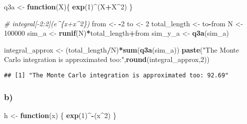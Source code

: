 \documentclass[
]{article}
\newenvironment{Shaded}{\begin{snugshade}}{\end{snugshade}}
\newcommand{\CommentTok}[1]{\textcolor[rgb]{0.56,0.35,0.01}{\textit{#1}}}
\newcommand{\ControlFlowTok}[1]{\textcolor[rgb]{0.13,0.29,0.53}{\textbf{#1}}}
\newcommand{\DecValTok}[1]{\textcolor[rgb]{0.00,0.00,0.81}{#1}}
\newcommand{\FunctionTok}[1]{\textcolor[rgb]{0.13,0.29,0.53}{\textbf{#1}}}
\newcommand{\NormalTok}[1]{#1}
\newcommand{\OtherTok}[1]{\textcolor[rgb]{0.56,0.35,0.01}{#1}}
\newcommand{\SpecialCharTok}[1]{\textcolor[rgb]{0.81,0.36,0.00}{\textbf{#1}}}
\newcommand{\StringTok}[1]{\textcolor[rgb]{0.31,0.60,0.02}{#1}}
\begin{document}
\begin{Shaded}
\begin{Highlighting}[]
\NormalTok{q3a }\OtherTok{\textless{}{-}} \ControlFlowTok{function}\NormalTok{(X)\{}
  \FunctionTok{exp}\NormalTok{(}\DecValTok{1}\NormalTok{)}\SpecialCharTok{\^{}}\NormalTok{(X}\SpecialCharTok{+}\NormalTok{X}\SpecialCharTok{\^{}}\DecValTok{2}\NormalTok{)}
\NormalTok{\}}
\end{Highlighting}
\end{Shaded}

\begin{Shaded}
\begin{Highlighting}[]
\CommentTok{\# integral[{-}2:2](e\^{}\{x+x\^{}2\})}
\NormalTok{from }\OtherTok{\textless{}{-}} \SpecialCharTok{{-}}\DecValTok{2}
\NormalTok{to }\OtherTok{\textless{}{-}} \DecValTok{2}
\NormalTok{total\_length }\OtherTok{\textless{}{-}}\NormalTok{ to}\SpecialCharTok{{-}}\NormalTok{from}
\NormalTok{N }\OtherTok{\textless{}{-}}  \DecValTok{100000}
\NormalTok{sim\_a }\OtherTok{\textless{}{-}} \FunctionTok{runif}\NormalTok{(N)}\SpecialCharTok{*}\NormalTok{total\_length}\SpecialCharTok{+}\NormalTok{from}
\NormalTok{sim\_y\_a }\OtherTok{\textless{}{-}} \FunctionTok{q3a}\NormalTok{(sim\_a)}

\NormalTok{integral\_approx }\OtherTok{\textless{}{-}}\NormalTok{ (total\_length}\SpecialCharTok{/}\NormalTok{N)}\SpecialCharTok{*}\FunctionTok{sum}\NormalTok{(}\FunctionTok{q3a}\NormalTok{(sim\_a))}
\FunctionTok{paste}\NormalTok{(}\StringTok{"The Monte Carlo integration is approximated too:"}\NormalTok{,}\FunctionTok{round}\NormalTok{(integral\_approx,}\DecValTok{2}\NormalTok{))}
\end{Highlighting}
\end{Shaded}

\begin{verbatim}
## [1] "The Monte Carlo integration is approximated too: 92.69"
\end{verbatim}

\hypertarget{b-1}{%
\subsubsection{b)}\label{b-1}}

\begin{Shaded}
\begin{Highlighting}[]
\NormalTok{h }\OtherTok{\textless{}{-}} \ControlFlowTok{function}\NormalTok{(x) \{}
    \FunctionTok{exp}\NormalTok{(}\DecValTok{1}\NormalTok{)}\SpecialCharTok{\^{}{-}}\NormalTok{(x}\SpecialCharTok{\^{}}\DecValTok{2}\NormalTok{)}
\NormalTok{\}}
\end{Highlighting}
\end{Shaded}
\end{document}
